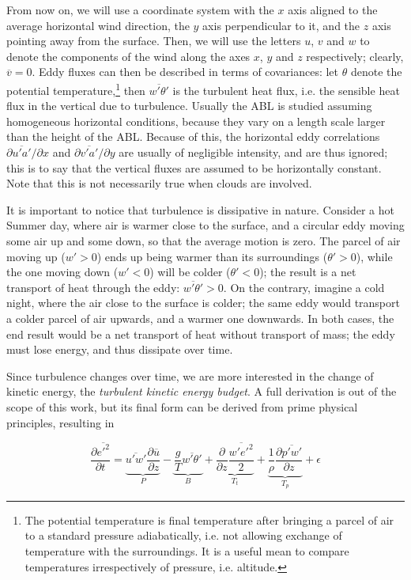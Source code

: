 \documentclass[a4paper,11pt]{kth-mag}
\begin{document}
From now on, we will use a coordinate system with the $x$ axis aligned to the average horizontal wind direction, the $y$ axis perpendicular to it, and the $z$ axis pointing away from the surface. Then, we will use the letters $u$, $v$ and $w$ to denote the components of the wind along the axes $x$, $y$ and $z$ respectively; clearly, $\overline{v}=0$. Eddy fluxes can then be described in terms of covariances: let $\theta$ denote the potential temperature,\footnote{The potential temperature is final temperature after bringing a parcel of air to a standard pressure adiabatically, i.e. not allowing exchange of temperature with the surroundings. It is a useful mean to compare temperatures irrespectively of pressure, i.e. altitude.} then $\overline{w'\theta'}$ is the turbulent heat flux, i.e. the sensible heat flux in the vertical due to turbulence. Usually the ABL is studied assuming homogeneous horizontal conditions, because they vary on a length scale larger than the height of the ABL. Because of this, the horizontal eddy correlations $\partial\overline{u'a'}/\partial x$ and $\partial\overline{v'a'}/\partial y$ are usually of negligible intensity, and are thus ignored; this is to say that the vertical fluxes are assumed to be horizontally constant. Note that this is not necessarily true when clouds are involved.

It is important to notice that turbulence is dissipative in nature. Consider a hot Summer day, where air is warmer close to the surface, and a circular eddy moving some air up and some down, so that the average motion is zero. The parcel of air moving up ($w'>0$) ends up being warmer than its surroundings ($\theta'>0$), while the one moving down ($w'<0$) will be colder ($\theta'<0$); the result is a net transport of heat through the eddy: $\overline{w'\theta'}>0$. On the contrary, imagine a cold night, where the air close to the surface is colder; the same eddy would transport a colder parcel of air upwards, and a warmer one downwards. In both cases, the end result would be a net transport of heat without transport of mass; the eddy must lose energy, and thus dissipate over time.

Since turbulence changes over time, we are more interested in the change of kinetic energy, the \emph{turbulent kinetic energy budget}. A full derivation is out of the scope of this work, but its final form \citep{basicatm} can be derived from prime physical principles, resulting in

\begin{equation}
\frac{\partial\overline{{e'}^2}}{\partial t}
=\underbrace{\overline{u'w'}\frac{\partial\overline{u}}{\partial z}}_P
-\underbrace{\frac{g}{T}\overline{w'\theta'}}_B
+\underbrace{\frac{\partial}{\partial z}\frac{\overline{w'{e'}^2}}{2}}_{T_t}
+\underbrace{\frac{1}{\rho}\frac{\partial\overline{p'w'}}{\partial z}}_{T_p}
+\epsilon
\end{equation}
\end{document}
